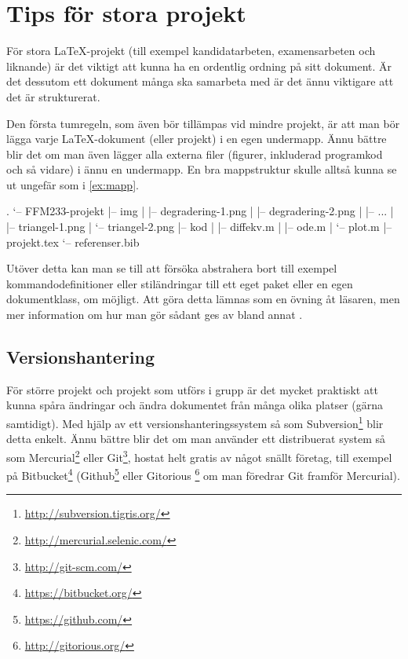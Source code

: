 \documentclass[10pt,../../a4.tex]{subfiles}
\begin{document}
\section{Tips för stora projekt}
För stora \LaTeX-projekt (till exempel kandidatarbeten, examensarbeten
och liknande) är det viktigt att kunna ha en ordentlig ordning på sitt
dokument. Är det dessutom ett dokument många ska samarbeta med är det
ännu viktigare att det är strukturerat.

Den första tumregeln, som även bör tillämpas vid mindre projekt, är att
man bör lägga varje \LaTeX-dokument (eller projekt) i en egen undermapp.
Ännu bättre blir det om man även lägger alla externa filer (figurer,
inkluderad programkod och så vidare) i ännu en undermapp. En bra
mappstruktur skulle alltså kunna se ut ungefär som i \cref{ex:mapp}.

\begin{kod}
	\begin{textcode}
.
`-- FFM233-projekt
|-- img
|   |-- degradering-1.png
|   |-- degradering-2.png
|   |-- ...
|   |-- triangel-1.png
|   `-- triangel-2.png
|-- kod
|   |-- diffekv.m
|   |-- ode.m
|   `-- plot.m
|-- projekt.tex
`-- referenser.bib
	\end{textcode}
	\caption{En bra mappstruktur för ett enkelt \LaTeX-projekt.}
	\label{ex:mapp}
\end{kod}

Utöver detta kan man se till att försöka abstrahera bort till exempel
kommandodefinitioner eller stiländringar till ett eget paket eller en
egen dokumentklass, om möjligt. Att göra detta lämnas som en övning åt
läsaren, men mer information om hur man gör sådant ges av bland annat
\textcites{Flynn06}{LaTeX3}{Robertson06}.

\subsection{Versionshantering}
För större projekt och projekt som utförs i grupp är det mycket praktiskt
att kunna spåra ändringar och ändra dokumentet från många olika platser
(gärna samtidigt). Med hjälp av ett versionshanteringssystem så som 
Subversion\footnote{\url{http://subversion.tigris.org/}} blir detta
enkelt. Ännu bättre blir det om man använder ett distribuerat system så
som Mercurial\footnote{\url{http://mercurial.selenic.com/}} eller
Git\footnote{\url{http://git-scm.com/}}, hostat helt gratis av något snällt
företag, till exempel på Bitbucket\footnote{\url{https://bitbucket.org/}}
(Github\footnote{\url{https://github.com/}} eller Gitorious%
\footnote{\url{http://gitorious.org/}} om man föredrar Git framför Mercurial).
\end{document}
